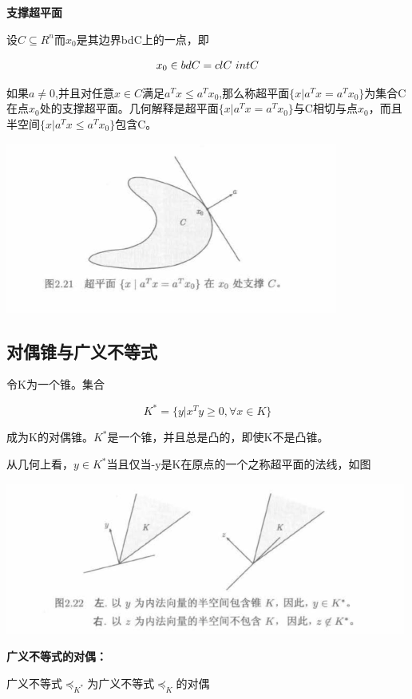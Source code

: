 \documentclass{ctexart}
\begin{document}
	\textbf{支撑超平面}
	
	设\(C \subseteq R^n\)而\(x_0\)是其边界bdC上的一点，即
	
	\[x_0 \in bdC = clC \\\ intC\]
	
	如果\(a \neq 0\),并且对任意\(x \in C\)满足\(a^Tx \leq a^Tx_0\),那么称超平面\(\{x|a^Tx = a^Tx_0\}\)为集合C在点\(x_0\)处的支撑超平面。几何解释是超平面\(\{x|a^Tx = a^Tx_0\}\)与C相切与点\(x_0\)，而且半空间\(\{x|a^Tx \leq a^Tx_0\}\)包含C。
	
	\includegraphics[width=1\linewidth]{pic/pic2_21}
	
	\subsection{对偶锥与广义不等式}
	
	令K为一个锥。集合
	
	\[K^*=\{y|x^Ty \geq 0 , \forall x \in K\}\]
	
	成为K的对偶锥。\(K^*\)是一个锥，并且总是凸的，即使K不是凸锥。
	
	从几何上看，\(y \in K^*\)当且仅当-y是K在原点的一个之称超平面的法线，如图
	
	\includegraphics[width=1\linewidth]{pic/pic2_22}
	
	\textbf{广义不等式的对偶：}
	
	广义不等式\(\preceq_{K^*}\)为广义不等式\(\preceq_{K}\)的对偶
	
	
	
	
	
	
	
	
\end{document}
